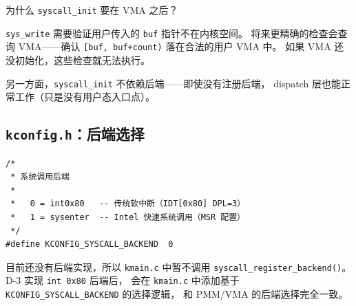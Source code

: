 \begin{whybox}
为什么 \texttt{syscall\_init} 要在 VMA 之后？

\texttt{sys\_write} 需要验证用户传入的 \texttt{buf} 指针不在内核空间。
将来更精确的检查会查询 VMA——确认 \texttt{[buf, buf+count)} 落在合法的用户 VMA 中。
如果 VMA 还没初始化，这些检查就无法执行。

另一方面，\texttt{syscall\_init} 不依赖后端——即使没有注册后端，
dispatch 层也能正常工作（只是没有用户态入口点）。
\end{whybox}

\subsection{\texttt{kconfig.h}：后端选择}

\begin{lstlisting}[style=cstyle]
/*
 * 系统调用后端
 *
 *   0 = int0x80   -- 传统软中断（IDT[0x80] DPL=3）
 *   1 = sysenter  -- Intel 快速系统调用（MSR 配置）
 */
#define KCONFIG_SYSCALL_BACKEND  0
\end{lstlisting}

目前还没有后端实现，所以 \texttt{kmain.c} 中暂不调用
\texttt{syscall\_register\_backend()}。D-3 实现 \texttt{int 0x80} 后端后，
会在 \texttt{kmain.c} 中添加基于 \texttt{KCONFIG\_SYSCALL\_BACKEND} 的选择逻辑，
和 PMM/VMA 的后端选择完全一致。
